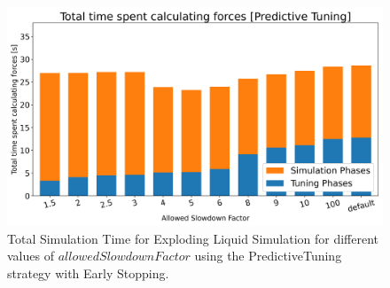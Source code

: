 \documentclass[conference]{IEEEtran}
\begin{document}
\begin{figure}[H]
    \centering

    \includegraphics[width=\columnwidth]{../data/explodingLiquid/cluster/predictiveTuning/analytics/total_time_average.png}

    \caption{Total Simulation Time for Exploding Liquid Simulation for different values of $allowedSlowdownFactor$ using the PredictiveTuning strategy with Early Stopping.}
    \label{fig:predictive_tuning}
\end{figure}
\end{document}
